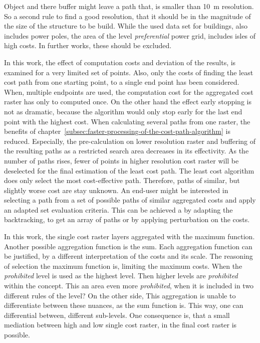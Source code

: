 Object and there buffer might leave a  path that, is smaller than 10~m resolution.
So a second rule to find a good resolution, that it should be in the magnitude of the size of the structure  to be build.
While the used data set for buildings, also includes power poles, the area of the level \textit{preferential} power grid, includes isles of high costs. 
In further works, these should be excluded.

In this work, the effect of computation costs and deviation of the results, is examined for a very limited set of points.
Also, only the costs of finding the least cost path from one starting point, to a single end point has been considered.
When, multiple endpoints are used, the computation cost for the aggregated cost raster has only to computed once.
On the other hand the effect early stopping is not as dramatic, because the algorithm would only stop early for the last end point with the highest cost.
When calculating several paths from one raster, the benefits of chapter~\ref{subsec:faster-processing-of-the-cost-path-algorithm} is reduced.
Especially, the pre-calculation on lower resolution raster and buffering of the resulting paths as a restricted search area decreases in its effectivity.
As the number of paths rises, fewer of points in higher resolution cost raster will be deselected for the final estimation of the least cost path.
The least cost algorithm does only select the most cost-effective path.
Therefore, paths of similar, but slightly worse cost are stay unknown.
An end-user might be interested in selecting a path from a set of possible paths of similar aggregated costs and apply an adapted set evaluation criteria.
This can be achieved a by adapting the backtracking, to get an array of paths or by applying perturbation on the costs.

In this work, the single cost raster layers aggregated with the maximum function. 
Another possible aggregation function is the sum.
Each aggregation function can be justified, by a different interpretation of the costs and its scale.
The reasoning of selection the maximum function is, limiting the maximum costs.
When the \textit{prohibited} level is used as the highest level.
Then higher levels are \textit{prohibited} within the concept.
This an area even more \textit{prohibited}, when it is included in two different rules of the level?
On the other side, This aggregation is unable to differentiate between these nuances, as  the sum function is.
This way, one can differential between, different sub-levels.
One consequence is, that a small mediation between high and low single cost raster, in the final cost raster is possible.

